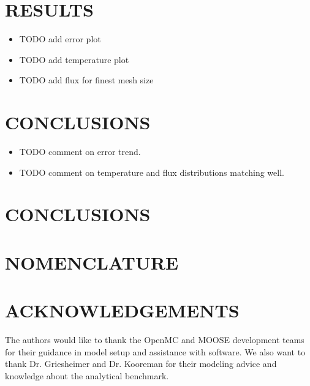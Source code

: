 \documentclass[letterpaper]{mc2023}
\begin{document}
\section{RESULTS}\label{sec:results}

\begin{itemize}
    \item TODO add error plot
    \item TODO add temperature plot
    \item TODO add flux for finest mesh size
\end{itemize}
\section{CONCLUSIONS}\label{sec:conclusions}

\begin{itemize}
    \item TODO comment on error trend.
    \item TODO comment on temperature and flux distributions matching well.
\end{itemize}


\section{CONCLUSIONS}


\section*{NOMENCLATURE}

\printglossary[title={Nomenclature}, nonumberlist, nopostdot]

\section*{ACKNOWLEDGEMENTS}
The authors would like to thank the OpenMC and MOOSE development teams for their guidance in model setup and assistance
with software. We also want to thank Dr. Griesheimer and Dr. Kooreman for their modeling advice and knowledge about the
analytical benchmark.

\setlength{\baselineskip}{12pt}


\setlength{\baselineskip}{12pt}
\end{document}
